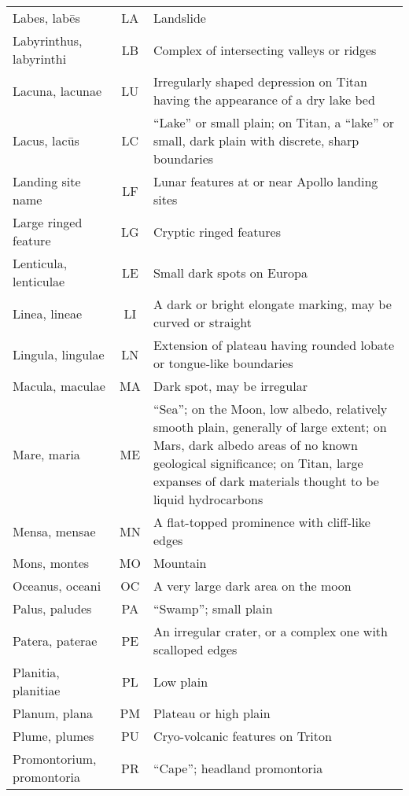 \begin{longtable}{l|c|p{72mm}}
Labes, labēs          & LA & Landslide\\%
Labyrinthus, labyrinthi & LB & Complex of intersecting valleys or ridges\\%
Lacuna, lacunae       & LU & Irregularly shaped depression on Titan having the appearance of a dry lake bed\\%
Lacus, lacūs          & LC & ``Lake'' or small plain; on Titan, a ``lake'' or small, 
                             dark plain with discrete, sharp boundaries\\%
Landing site name     & LF & Lunar features at or near Apollo landing sites\\%
Large ringed feature  & LG & Cryptic ringed features\\%
Lenticula, lenticulae & LE & Small dark spots on Europa\\%
Linea, lineae         & LI & A dark or bright elongate marking, may be curved or straight\\%
Lingula, lingulae     & LN & Extension of plateau having rounded lobate or tongue-like boundaries\\\midrule
Macula, maculae       & MA & Dark spot, may be irregular\\%
Mare, maria           & ME & ``Sea''; on the Moon, low albedo, relatively smooth plain, generally of large extent; 
                             on Mars, dark albedo areas of no known geological significance; 
                             on Titan, large expanses of dark materials thought to be liquid hydrocarbons\\%
Mensa, mensae         & MN & A flat-topped prominence with cliff-like edges\\%
Mons, montes          & MO & Mountain\\\midrule   
Oceanus, oceani       & OC & A very large dark area on the moon\\\midrule
Palus, paludes        & PA & ``Swamp''; small plain\\%
Patera, paterae       & PE & An irregular crater, or a complex one with scalloped edges\\%
Planitia, planitiae   & PL & Low plain\\%
Planum, plana         & PM & Plateau or high plain\\%
Plume, plumes         & PU & Cryo-volcanic features on Triton\\%
Promontorium, promontoria & PR & ``Cape''; headland promontoria\\\midrule

\end{longtable}
